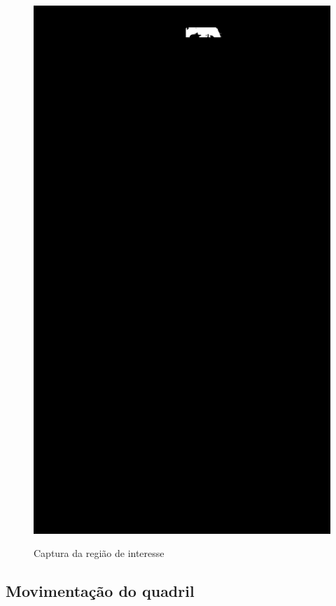 \begin{figure}[H]
	\centering
    \caption{Captura da região de interesse}
	\includegraphics[scale=0.13]{figuras/ultrapassar_barra/134_only_interesse.png}
	\label{fig:ultrapassar_barra}
\end{figure}




\subsection[Movimentação do quadril]{Movimentação do quadril}\label{sec:Movimentacao do quadril}

